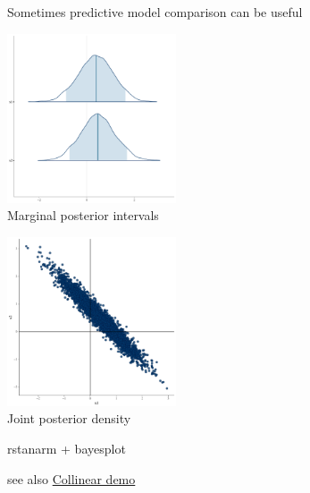 \documentclass[english,t]{beamer}
\begin{document}
\begin{frame}{}

  {\Large\color{navyblue} Sometimes predictive model comparison can be useful}

      \begin{minipage}[t]{0.45\linewidth}
        \begin{center}
          \includegraphics[width=5cm]{fitg2_xx_areas.pdf}\\
          Marginal posterior intervals
        \end{center} 
      \end{minipage}
      \pause
      \begin{minipage}[t]{0.45\linewidth}
        \begin{center}
          \includegraphics[width=5cm]{fitg2_xx_scatter.pdf}\\
          Joint posterior density
        \end{center} 
      \end{minipage}

            \begin{center}
      {\scriptsize rstanarm + bayesplot}
    \end{center}

    \pause
    {\small
      see also \href{https://avehtari.github.io/modelselection/collinear.html}{Collinear demo}
    }

\end{frame}
\end{document}
